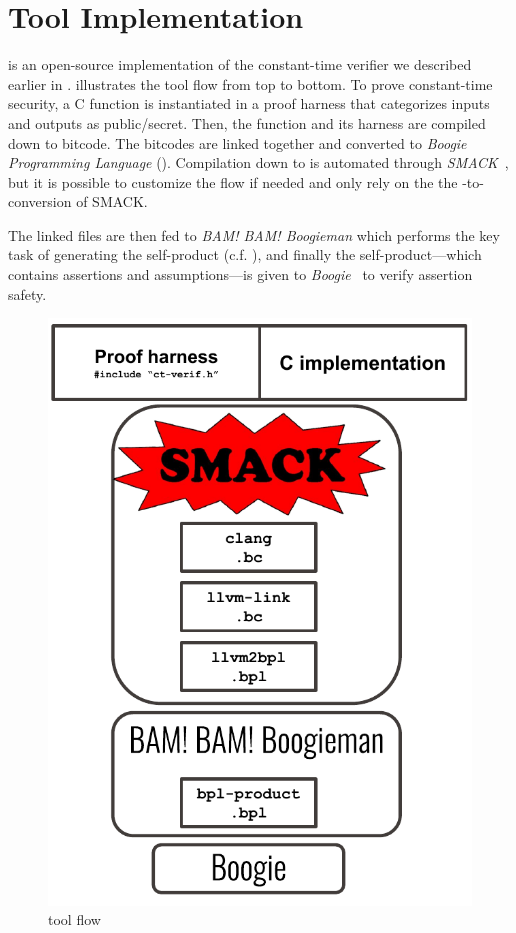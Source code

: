 \section{Tool Implementation}\label{sec:tooling}

\ctVerif is an open-source implementation of the constant-time verifier we
described earlier in .  illustrates the
tool flow from top to bottom. To prove constant-time security, a C function is
instantiated in a proof harness that categorizes inputs and outputs as public/secret. Then,
the function and its harness are compiled down to  bitcode. The
bitcodes are linked together and converted to \emph{Boogie Programming
Language} (). Compilation down to  is automated
through \emph{SMACK}~\cite{smack}, but it is possible to customize the flow if
needed and only rely on the the -to- conversion
of SMACK.

The linked  files are then fed to \emph{BAM! BAM! Boogieman} which
performs the key task of generating the self-product (c.f. ), and
finally the self-product---which contains assertions and assumptions---is
given to \emph{Boogie}~\cite{boogie} to verify assertion safety.


\begin{figure}[h]
    \centering
    \includegraphics[height=0.4\textheight]{figs/ct-verif-flow.pdf}
    \caption{\ctVerif tool flow}
    \label{fig:ct-verif-flow}
\end{figure}




